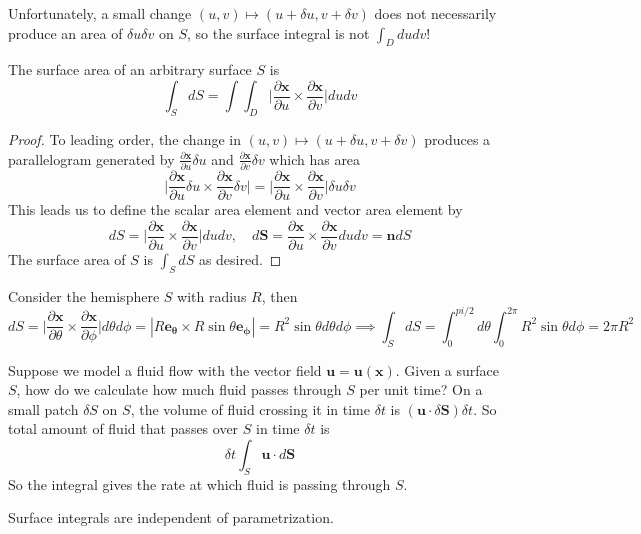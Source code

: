 \documentclass[a4paper]{article}
\begin{document}
Unfortunately, a small change $(u,v)\mapsto(u+\delta u,v+\delta v)$ does not necessarily produce an area of $\delta u\delta v$ on $S$, so the surface integral is not $\int_Ddudv$!
\begin{prop}
The surface area of an arbitrary surface $S$ is
\begin{equation}
    \int_SdS=\int\int_D\bigg|\frac{\partial\mathbf{x}}{\partial u}\times\frac{\partial\mathbf{x}}{\partial v}\bigg|dudv\tag{1.21a}
\end{equation}
\end{prop}
\begin{proof}
To leading order, the change in $(u,v)\mapsto(u+\delta u,v+\delta v)$ produces a parallelogram generated by $\frac{\partial\mathbf{x}}{\partial u}\delta u$ and $\frac{\partial\mathbf{x}}{\partial v}\delta v$ which has area
$$\bigg|\frac{\partial\mathbf{x}}{\partial u}\delta u\times\frac{\partial\mathbf{x}}{\partial v}\delta v\bigg|=\bigg|\frac{\partial\mathbf{x}}{\partial u}\times\frac{\partial\mathbf{x}}{\partial v}\bigg|\delta u\delta v$$
This leads us to define the scalar area element and vector area element by
\begin{equation}
    dS=\bigg|\frac{\partial\mathbf{x}}{\partial u}\times\frac{\partial\mathbf{x}}{\partial v}\bigg|dudv,\quad d\mathbf{S}=\frac{\partial\mathbf{x}}{\partial u}\times\frac{\partial\mathbf{x}}{\partial v}dudv=\mathbf{n}dS\tag{1.21b}
\end{equation}
The surface area of $S$ is $\int_SdS$ as desired.
\end{proof}
\begin{eg}
Consider the hemisphere $S$ with radius $R$, then
$$dS=\bigg|\frac{\partial\mathbf{x}}{\partial\theta}\times\frac{\partial\mathbf{x}}{\partial\phi}\bigg|d\theta d\phi=|R\boldsymbol{e_\theta}\times R\sin\theta\boldsymbol{e_\phi}|=R^2\sin\theta d\theta d\phi\implies \int_SdS=\int_0^{pi/2}d\theta\int_0^{2\pi}R^2\sin\theta d\phi=2\pi R^2$$
\end{eg}
\begin{eg}
Suppose we model a fluid flow with the vector field $\mathbf{u} = \mathbf{u}(\mathbf{x})$. Given a surface $S$, how do we calculate how much fluid passes through $S$ per unit time? On a small patch $\delta S$ on $S$, the volume of fluid crossing it in time $\delta t$ is $(\mathbf{u}\cdot\delta\mathbf{S})\delta t$. So total amount of fluid that passes over $S$ in time $\delta t$ is
$$\delta t\int_S\mathbf{u}\cdot d\mathbf{S}$$
So the integral gives the rate at which fluid is passing through $S$. 
\end{eg}
\begin{prop}
Surface integrals are independent of parametrization.
\end{prop}
\end{document}
